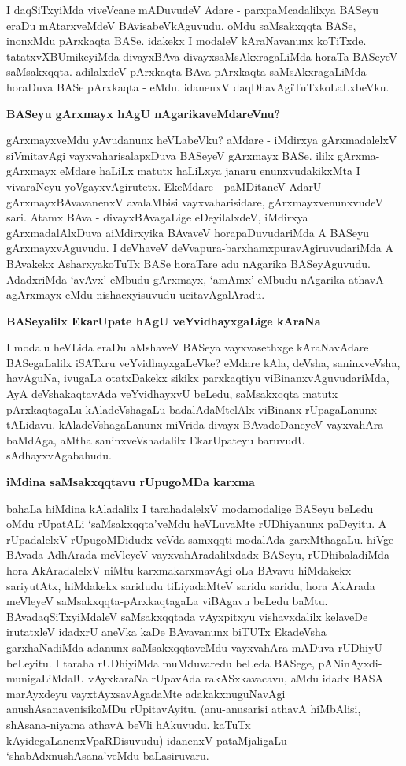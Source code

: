 I daqSiTxyiMda viveVcane mADuvudeV Adare - parxpaMcadalilxya BASeyu eraDu mAtarxveMdeV BAvisabeVkAguvudu. oMdu saMsakxqqta BASe, inonxMdu pArxkaqta BASe. idakekx I modaleV kAraNavanunx koTiTxde. tatatxvXBUmikeyiMda divayxBAva-divayxsaMsAkxragaLiMda horaTa BASeyeV saMsakxqqta. adilalxdeV pArxkaqta BAva-pArxkaqta saMsAkxragaLiMda horaDuva BASe pArxkaqta - eMdu. idanenxV daqDhavAgiTuTxkoLaLxbeVku.

\noindent
\textbf{BASeyu gArxmayx hAgU nAgarikaveMdareVnu?}\label{page11}

gArxmayxveMdu yAvudanunx heVLabeVku? aMdare - iMdirxya gArxmadalelxV siVmitavAgi vayxvaharisalapxDuva BASeyeV gArxmayx BASe. ililx gArxma-gArxmayx eMdare haLiLx matutx haLiLxya janaru enunxvudakikxMta I vivaraNeyu yoVgayxvAgirutetx. EkeMdare - paMDitaneV AdarU gArxmayxBAvavanenxV avalaMbisi vayxvaharisidare, gArxmayxvenunxvudeV sari. Atamx BAva - divayxBAvagaLige eDeyilalxdeV, iMdirxya gArxmadalAlxDuva aiMdirxyika BAvaveV horapaDuvudariMda A BASeyu gArxmayxvAguvudu. I deVhaveV deVvapura-barxhamxpuravAgiruvudariMda A BAvakekx AsharxyakoTuTx BASe horaTare adu nAgarika BASeyAguvudu. AdadxriMda `avAvx' eMbudu gArxmayx, `amAmx' eMbudu nAgarika athavA agArxmayx eMdu nishacxyisuvudu ucitavAgalAradu. 

\noindent
\textbf{BASeyalilx EkarUpate hAgU veYvidhayxgaLige kAraNa}\label{page11}

I modalu heVLida eraDu aMshaveV BASeya vayxvasethxge kAraNavAdare BASegaLalilx iSATxru veYvidhayxgaLeVke? eMdare kAla, deVsha, saninxveVsha, havAguNa, ivugaLa otatxDakekx sikikx parxkaqtiyu viBinanxvAguvudariMda, AyA deVshakaqtavAda veYvidhayxvU beLedu, saMsakxqqta matutx pArxkaqtagaLu kAladeVshagaLu badalAdaMtelAlx viBinanx rUpagaLanunx tALidavu. kAladeVshagaLanunx miVrida divayx BAvadoDaneyeV vayxvahAra baMdAga, aMtha saninxveVshadalilx EkarUpateyu baruvudU sAdhayxvAgabahudu.

\noindent
\textbf{iMdina saMsakxqqtavu rUpugoMDa karxma}\label{page12}

bahaLa hiMdina kAladalilx I tarahadalelxV modamodalige BASeyu beLedu oMdu rUpatALi `saMsakxqqta'veMdu heVLuvaMte rUDhiyanunx paDeyitu. A rUpadalelxV rUpugoMDidudx veVda-samxqqti modalAda garxMthagaLu. hiVge BAvada AdhArada meVleyeV vayxvahAradalilxdadx BASeyu, rUDhibaladiMda hora AkAradalelxV niMtu karxmakarxmavAgi oLa BAvavu hiMdakekx sariyutAtx, hiMdakekx saridudu tiLiyadaMteV saridu saridu, hora AkArada meVleyeV saMsakxqqta-pArxkaqtagaLa viBAgavu beLedu baMtu. BAvadaqSiTxyiMdaleV saMsakxqqtada vAyxpitxyu vishavxdalilx kelaveDe irutatxleV idadxrU aneVka kaDe BAvavanunx biTUTx EkadeVsha garxhaNadiMda adanunx saMsakxqqtaveMdu vayxvahAra mADuva rUDhiyU beLeyitu. I taraha rUDhiyiMda muMduvaredu beLeda BASege, pANinAyxdi-munigaLiMdalU vAyxkaraNa rUpavAda rakASxkavacavu, aMdu idadx BASA marAyxdeyu vayxtAyxsavAgadaMte adakakxnuguNavAgi anushAsanavenisikoMDu rUpitavAyitu. (anu-anusarisi athavA hiMbAlisi, shAsana-niyama athavA beVli hAkuvudu. kaTuTx kAyidegaLanenxVpaRDisuvudu) idanenxV pataMjaligaLu `shabAdxnushAsana'veMdu baLasiruvaru.


